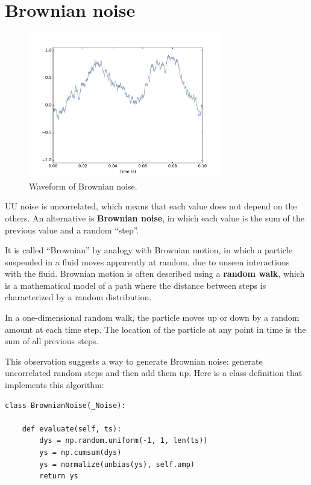 \documentclass[12pt]{book}
\begin{document}
\section{Brownian noise}
\label{brownian}

\begin{figure}
\centerline{\includegraphics[height=2.5in]{figs/rednoise0.pdf}}
\caption{Waveform of Brownian noise.}
\label{fig.rednoise0}
\end{figure}

UU noise is uncorrelated, which means that each value does not depend
on the others.  An alternative is {\bf Brownian noise}, in which each value
is the sum of the previous value and a random ``step''.

It is called ``Brownian'' by analogy with Brownian motion, in which a
particle suspended in a fluid moves apparently at random, due to
unseen interactions with the fluid.  Brownian motion is often
described using a {\bf random walk}, which is a mathematical model 
of a path where the distance between steps is characterized by a
random distribution.

In a one-dimensional random walk, the particle moves up or down
by a random amount at each time step.  The location of the particle
at any point in time is the sum of all previous steps.

This observation suggests a way to generate Brownian noise:
generate uncorrelated random steps and then add them up.
Here is a class definition that implements this algorithm:

\begin{verbatim}
class BrownianNoise(_Noise):

    def evaluate(self, ts):
        dys = np.random.uniform(-1, 1, len(ts))
        ys = np.cumsum(dys)
        ys = normalize(unbias(ys), self.amp)
        return ys
\end{verbatim}
\end{document}
